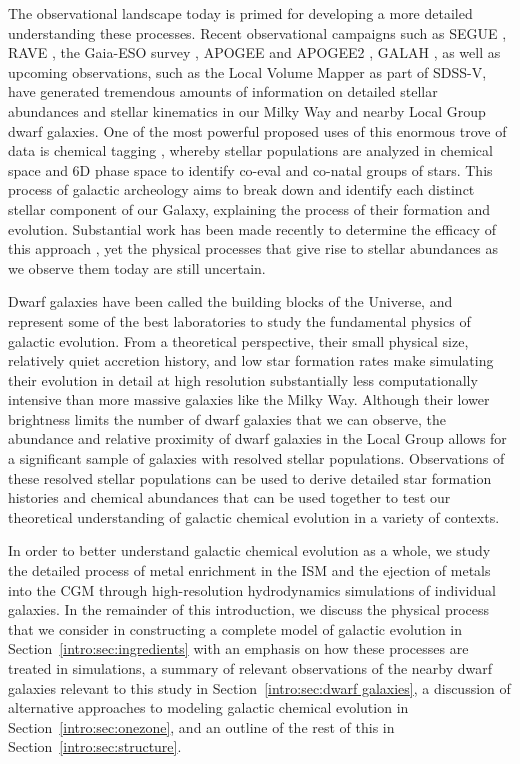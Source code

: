 The observational landscape today is primed for developing a more detailed understanding these processes. Recent observational campaigns such as SEGUE \citep{Yanny2009}, RAVE \citep{Kunder2017}, the Gaia-ESO survey \citep{Gaia}, APOGEE and APOGEE2 \citep{APOGEE2010,APOGEE}, GALAH \citep{GALAH,Buder2018}, as well as upcoming observations, such as the Local Volume Mapper as part of SDSS-V, have generated tremendous amounts of information on detailed stellar abundances and stellar kinematics in our Milky Way and nearby Local Group dwarf galaxies. One of the most powerful proposed uses of this enormous trove of data is chemical tagging \citep{Freeman2002}, whereby stellar populations are analyzed in chemical space and 6D phase space to identify co-eval and co-natal groups of stars. This process of galactic archeology aims to break down and identify each distinct stellar component of our Galaxy, explaining the process of their formation and evolution. Substantial work has been made recently to determine the efficacy of this approach \citep[e.g.][]{Ting2012,Hogg2016,Jofre107,Price-Jones2018,Armillotta2018}, yet the physical processes that give rise to stellar abundances as we observe them today are still uncertain.


Dwarf galaxies have been called the building blocks of the Universe, and represent some of the best laboratories to study the fundamental physics of galactic evolution. From a theoretical perspective, their small physical size, relatively quiet accretion history, and low star formation rates make simulating their evolution in detail at high resolution substantially less computationally intensive than more massive galaxies like the Milky Way. Although their lower brightness limits the number of dwarf galaxies that we can observe, the abundance and relative proximity of dwarf galaxies in the Local Group allows for a significant sample of galaxies with resolved stellar populations. Observations of these resolved stellar populations can be used to derive detailed star formation histories and chemical abundances that can be used together to test our theoretical understanding of galactic chemical evolution in a variety of contexts.

In order to better understand galactic chemical evolution as a whole, we study the detailed process of metal enrichment in the ISM and the ejection of metals into the CGM through high-resolution hydrodynamics simulations of individual galaxies. In the remainder of this introduction, we discuss the physical process that we consider in constructing a complete model of galactic evolution in Section~\ref{intro:sec:ingredients} with an emphasis on how these processes are treated in simulations, a summary of relevant observations of the nearby dwarf galaxies relevant to this study in Section~\ref{intro:sec:dwarf galaxies}, a discussion of alternative approaches to modeling galactic chemical evolution in Section~\ref{intro:sec:onezone}, and an outline of the rest of this \dissertation in Section~\ref{intro:sec:structure}.

